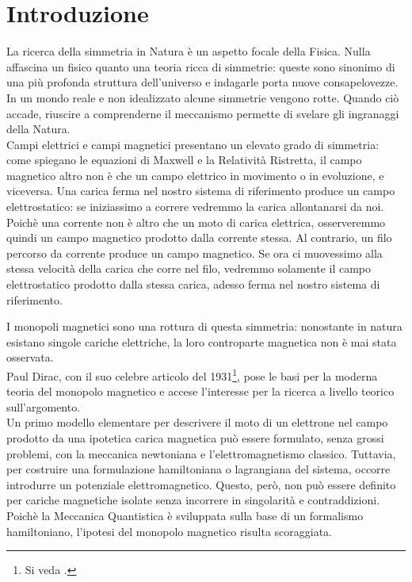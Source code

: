 \chapter*{Introduzione}

La ricerca della simmetria in Natura è un aspetto focale della Fisica. Nulla
affascina un fisico quanto una teoria ricca di simmetrie: queste sono sinonimo
di una più profonda struttura dell'universo e indagarle porta nuove consapelovezze.
In un mondo reale e non idealizzato alcune simmetrie vengono rotte. Quando ciò
accade, riuscire a comprenderne il meccanismo permette di svelare gli ingranaggi
della Natura.\\

Campi elettrici e campi magnetici presentano un elevato grado di simmetria: come
spiegano le equazioni di Maxwell e la Relatività Ristretta, il campo magnetico
altro non è che un campo elettrico in movimento o in evoluzione, e viceversa.
Una carica ferma nel nostro sistema di riferimento produce un campo elettrostatico:
se iniziassimo a correre vedremmo la carica allontanarsi da noi. Poichè
una corrente non è altro che un moto di carica elettrica, osserveremmo quindi un campo
magnetico prodotto dalla corrente stessa.
Al contrario, un filo percorso da corrente produce un campo magnetico. Se ora ci muovessimo
alla stessa velocità della carica che corre nel filo, vedremmo solamente il campo
elettrostatico prodotto dalla stessa carica, adesso ferma nel nostro sistema di riferimento.

I monopoli magnetici sono una rottura di questa simmetria: nonostante in natura
esistano singole cariche elettriche, la loro controparte magnetica non è mai
stata osservata.\\

Paul Dirac, con il suo celebre articolo del 1931\footnote{Si veda \cite{dirac}.}, pose le basi per
la moderna teoria del monopolo magnetico e accese l'interesse per la ricerca a
livello teorico sull'argomento.\\
Un primo modello elementare per descrivere il moto di un elettrone
nel campo prodotto da una ipotetica carica magnetica può essere formulato,
senza grossi problemi, con la meccanica newtoniana e l'elettromagnetismo classico.
Tuttavia, per costruire una formulazione hamiltoniana o lagrangiana del sistema,
occorre introdurre un potenziale elettromagnetico. Questo, però, non può essere
definito per cariche magnetiche isolate senza incorrere in singolarità e contraddizioni.
Poichè la Meccanica Quantistica è sviluppata sulla base di un formalismo
hamiltoniano, l'ipotesi del monopolo magnetico risulta scoraggiata.

